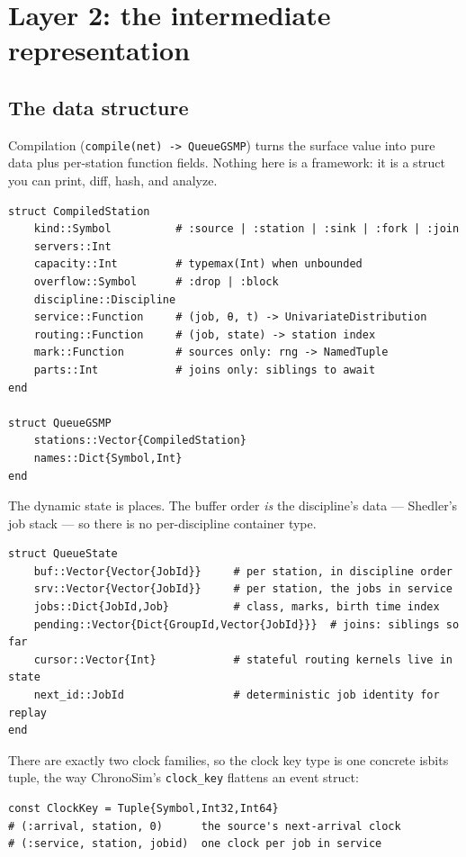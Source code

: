 \documentclass[11pt]{article}
\newcommand{\code}[1]{\texttt{#1}}
\begin{document}
\section{Layer 2: the intermediate representation}

\subsection{The data structure}

Compilation (\code{compile(net) -> QueueGSMP}) turns the surface value into
pure data plus per-station function fields. Nothing here is a framework: it is
a struct you can print, diff, hash, and analyze.

\begin{lstlisting}
struct CompiledStation
    kind::Symbol          # :source | :station | :sink | :fork | :join
    servers::Int
    capacity::Int         # typemax(Int) when unbounded
    overflow::Symbol      # :drop | :block
    discipline::Discipline
    service::Function     # (job, θ, t) -> UnivariateDistribution
    routing::Function     # (job, state) -> station index
    mark::Function        # sources only: rng -> NamedTuple
    parts::Int            # joins only: siblings to await
end

struct QueueGSMP
    stations::Vector{CompiledStation}
    names::Dict{Symbol,Int}
end
\end{lstlisting}

The dynamic state is places. The buffer order \emph{is} the discipline's
data --- Shedler's job stack --- so there is no per-discipline container type.

\begin{lstlisting}
struct QueueState
    buf::Vector{Vector{JobId}}     # per station, in discipline order
    srv::Vector{Vector{JobId}}     # per station, the jobs in service
    jobs::Dict{JobId,Job}          # class, marks, birth time index
    pending::Vector{Dict{GroupId,Vector{JobId}}}  # joins: siblings so far
    cursor::Vector{Int}            # stateful routing kernels live in state
    next_id::JobId                 # deterministic job identity for replay
end
\end{lstlisting}

There are exactly two clock families, so the clock key type is one concrete
isbits tuple, the way ChronoSim's \code{clock\_key} flattens an event struct:

\begin{lstlisting}
const ClockKey = Tuple{Symbol,Int32,Int64}
# (:arrival, station, 0)      the source's next-arrival clock
# (:service, station, jobid)  one clock per job in service
\end{lstlisting}
\end{document}
